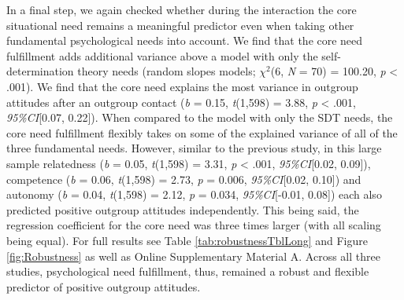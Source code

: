 In a final step, we again checked whether during the interaction the
core situational need remains a meaningful predictor even when taking
other fundamental psychological needs into account. We find that the
core need fulfillment adds additional variance above a model with only
the self-determination theory needs (random slopes models; \(\chi^2\)(6,
\textit{N} = 70) = 100.20, \textit{p} \textless{} .001). We find that
the core need explains the most variance in outgroup attitudes after an
outgroup contact (\textit{b} = 0.15, \textit{t}(1,598) = 3.88,
\textit{p} \textless{} .001, \textit{95\%CI}{[}0.07, 0.22{]}). When
compared to the model with only the SDT needs, the core need fulfillment
flexibly takes on some of the explained variance of all of the three
fundamental needs. However, similar to the previous study, in this large
sample relatedness (\textit{b} = 0.05, \textit{t}(1,598) = 3.31,
\textit{p} \textless{} .001, \textit{95\%CI}{[}0.02, 0.09{]}),
competence (\textit{b} = 0.06, \textit{t}(1,598) = 2.73, \textit{p} =
0.006, \textit{95\%CI}{[}0.02, 0.10{]}) and autonomy (\textit{b} = 0.04,
\textit{t}(1,598) = 2.12, \textit{p} = 0.034, \textit{95\%CI}{[}-0.01,
0.08{]}) each also predicted positive outgroup attitudes independently.
This being said, the regression coefficient for the core need was three
times larger (with all scaling being equal). For full results see Table
\ref{tab:robustnessTblLong} and Figure \ref{fig:Robustness} as well as
Online Supplementary Material A. Across all three studies, psychological
need fulfillment, thus, remained a robust and flexible predictor of
positive outgroup attitudes.
